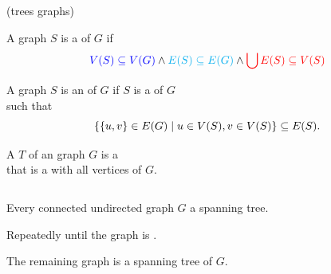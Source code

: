 
\begin{frame}{}

  \begin{center}
     (trees  graphs)
  \end{center}
\end{frame}

\begin{frame}{}
  \begin{definition}[Subgraph (子图)]
    A graph $S$ is a  of $G$ if
    \[
      \textcolor{blue}{V(S) \subseteq V(G)} \land \textcolor{cyan}{E(S) \subseteq E(G)}
      \land \textcolor{red}{\bigcup E(S) \subseteq V(S)}
    \]
  \end{definition}


  \pause
  \vspace{-0.30cm}
  \begin{definition}
    A graph $S$ is an  of $G$ if
    $S$ is a  of $G$ \\ such that
    \[
      \{\{u, v\} \in E(G) \mid u \in V(S), v \in V(S)\} \subseteq E(S).
    \]
  \end{definition}
\end{frame}

\begin{frame}{}
  \begin{definition}
    A  $T$ of an  graph $G$ is a  \\
    that is a  with all vertices of $G$.
  \end{definition}

  \pause
  \vspace{0.50cm}
  \begin{columns}
      \pause
  \end{columns}
\end{frame}

\begin{frame}{}
  \begin{theorem}
    Every connected undirected graph $G$  a spanning tree.
  \end{theorem}

  \pause
  \vspace{0.50cm}
  \begin{center}
    Repeatedly 
    until the graph is .

    \pause
    \vspace{0.30cm}
    The remaining graph is a spanning tree of $G$.
  \end{center}
\end{frame}

